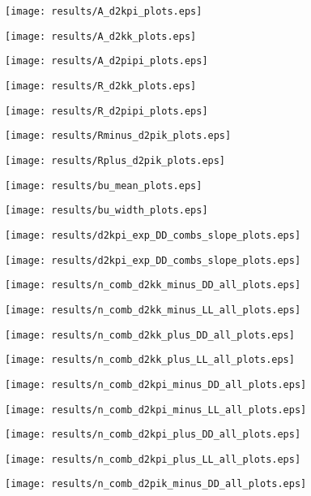 \documentclass[11pt,a4paper]{article}
\begin{document}
\texttt{[image: results/A\_d2kpi\_plots.eps]}

\texttt{[image: results/A\_d2kk\_plots.eps]}

\texttt{[image: results/A\_d2pipi\_plots.eps]}


\texttt{[image: results/R\_d2kk\_plots.eps]}

\texttt{[image: results/R\_d2pipi\_plots.eps]}


\texttt{[image: results/Rminus\_d2pik\_plots.eps]}

\texttt{[image: results/Rplus\_d2pik\_plots.eps]}


\texttt{[image: results/bu\_mean\_plots.eps]}

\texttt{[image: results/bu\_width\_plots.eps]}

\texttt{[image: results/d2kpi\_exp\_DD\_combs\_slope\_plots.eps]}

\texttt{[image: results/d2kpi\_exp\_DD\_combs\_slope\_plots.eps]}

\texttt{[image: results/n\_comb\_d2kk\_minus\_DD\_all\_plots.eps]}

\texttt{[image: results/n\_comb\_d2kk\_minus\_LL\_all\_plots.eps]}

\texttt{[image: results/n\_comb\_d2kk\_plus\_DD\_all\_plots.eps]}

\texttt{[image: results/n\_comb\_d2kk\_plus\_LL\_all\_plots.eps]}

\texttt{[image: results/n\_comb\_d2kpi\_minus\_DD\_all\_plots.eps]}

\texttt{[image: results/n\_comb\_d2kpi\_minus\_LL\_all\_plots.eps]}

\texttt{[image: results/n\_comb\_d2kpi\_plus\_DD\_all\_plots.eps]}

\texttt{[image: results/n\_comb\_d2kpi\_plus\_LL\_all\_plots.eps]}

\texttt{[image: results/n\_comb\_d2pik\_minus\_DD\_all\_plots.eps]}
\end{document}
